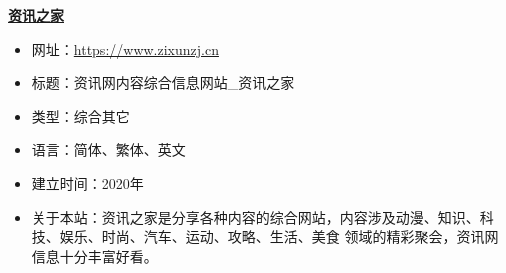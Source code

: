 \textbf{\href{https://www.zixunzj.cn}{资讯之家}}
\begin{itemize}
\item 网址：\href{https://www.zixunzj.cn}{https://www.zixunzj.cn}
\item 标题：资讯网内容综合信息网站_资讯之家
\item 类型：综合其它
\item 语言：简体、繁体、英文
\item 建立时间：2020年
\item 关于本站：资讯之家是分享各种内容的综合网站，内容涉及动漫、知识、科技、娱乐、时尚、汽车、运动、攻略、生活、美食 领域的精彩聚会，资讯网信息十分丰富好看。
\end{itemize}


